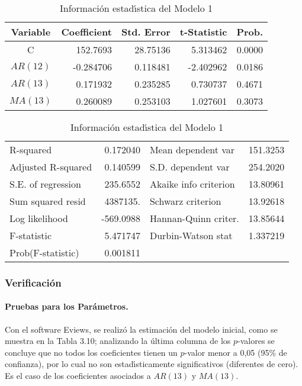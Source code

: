 \begin{table}[H]
\centering\small
\caption{Informaci\'{o}n estad\'{\i}stica del Modelo 1}
\begin{tabular}{@{}crrrr@{}}
\toprule
Variable& Coefficient& Std. Error& t-Statistic& Prob. \\
\midrule
C& 152.7693& 28.75136& 5.313462& 0.0000 \\
$AR(12)$& -0.284706& 0.118481& -2.402962& 0.0186 \\
$AR(13)$& 0.171932& 0.235285& 0.730737& 0.4671 \\
$MA(13)$& 0.260089& 0.253103& 1.027601& 0.3073 \\
\bottomrule
\end{tabular}

\begin{tabular}{@{}lrlr@{}}
\toprule
R-squared& 0.172040& Mean dependent var & 151.3253 \\
Adjusted R-squared& 0.140599& S.D. dependent var & 254.2020 \\
S.E. of regression& 235.6552& Akaike info criterion& 13.80961 \\
Sum squared resid& 4387135.& Schwarz criterion & 13.92618 \\
Log likelihood& -569.0988& Hannan-Quinn criter. & 13.85644 \\
F-statistic& 5.471747& Durbin-Watson stat & 1.337219 \\
Prob(F-statistic)& 0.001811&\\
\bottomrule
\end{tabular}
\end{table}



\subsubsection{Verificaci\'{o}n}

\paragraph{Pruebas para los Par\'{a}metros.} Con el software Eviews, se realiz\'{o} la estimaci\'{o}n del modelo inicial, como se muestra en la Tabla 3.10; analizando la \'{u}ltima columna de los $p$-valores se concluye que no todos los coeficientes tienen un $p$-valor menor a 0,05 (95{\%} de confianza), por lo cual no son estad\'{\i}sticamente significativos (diferentes de cero). Es el caso de los coeficientes asociados a $AR(13)$ y $MA(13)$.

